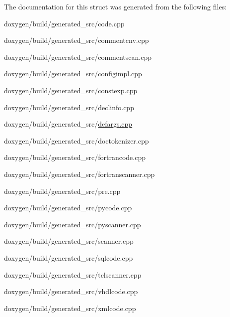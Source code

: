 The documentation for this struct was generated from the following files\+:\begin{DoxyCompactItemize}
\item 
doxygen/build/generated\+\_\+src/code.\+cpp\item 
doxygen/build/generated\+\_\+src/commentcnv.\+cpp\item 
doxygen/build/generated\+\_\+src/commentscan.\+cpp\item 
doxygen/build/generated\+\_\+src/configimpl.\+cpp\item 
doxygen/build/generated\+\_\+src/constexp.\+cpp\item 
doxygen/build/generated\+\_\+src/declinfo.\+cpp\item 
doxygen/build/generated\+\_\+src/\mbox{\hyperlink{defargs_8cpp}{defargs.\+cpp}}\item 
doxygen/build/generated\+\_\+src/doctokenizer.\+cpp\item 
doxygen/build/generated\+\_\+src/fortrancode.\+cpp\item 
doxygen/build/generated\+\_\+src/fortranscanner.\+cpp\item 
doxygen/build/generated\+\_\+src/pre.\+cpp\item 
doxygen/build/generated\+\_\+src/pycode.\+cpp\item 
doxygen/build/generated\+\_\+src/pyscanner.\+cpp\item 
doxygen/build/generated\+\_\+src/scanner.\+cpp\item 
doxygen/build/generated\+\_\+src/sqlcode.\+cpp\item 
doxygen/build/generated\+\_\+src/tclscanner.\+cpp\item 
doxygen/build/generated\+\_\+src/vhdlcode.\+cpp\item 
doxygen/build/generated\+\_\+src/xmlcode.\+cpp\end{DoxyCompactItemize}
